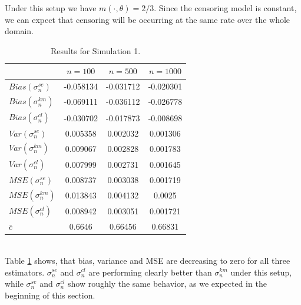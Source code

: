  Under this setup we have $m(\cdot, \theta) = 2/3$. Since the censoring model is constant, we can expect that censoring will be occurring at the same rate over the whole domain.
\begin{table}[h!]
	\begin{center}
		\begin{tabular}{| l || c | c | c |}
			\hline
			&       $n=100$   &    $n=500$    &    $n=1000$\\
			\hline
			\hline
			$Bias(\sigma_n^{se})$ & -0.058134 & -0.031712 & -0.020301\\
			$Bias(\sigma_n^{km})$ & -0.069111 & -0.036112 & -0.026778\\
			$Bias(\sigma_n^{cl})$ & -0.030702 & -0.017873 & -0.008698\\
			\hline
			$Var(\sigma_n^{se})$ & 0.005358 & 0.002032 & 0.001306\\
			$Var(\sigma_n^{km})$ & 0.009067 & 0.002828 & 0.001783\\
			$Var(\sigma_n^{cl})$ & 0.007999 & 0.002731 & 0.001645\\
			\hline
			$MSE(\sigma_n^{se})$ & 0.008737 & 0.003038 & 0.001719\\
			$MSE(\sigma_n^{km})$  & 0.013843 & 0.004132 & 0.0025\\
			$MSE(\sigma_n^{cl})$ & 0.008942 & 0.003051 & 0.001721\\
			\hline
			\hline
			$\bar c$  &0.6646 & 0.66456 & 0.66831\\
			\hline
		\end{tabular}
	\end{center}
	\caption{Results for Simulation 1.}
	\label{tab:res_expexp1}
\end{table}\\
%
Table \ref{tab:res_expexp1} shows, that bias, variance and MSE are decreasing to zero for all three estimators. $\sigma_n^{se}$ and $\sigma_n^{cl}$ are performing clearly better than $\sigma_n^{km}$ under this setup, while $\sigma_n^{se}$ and $\sigma_n^{cl}$ show roughly the same behavior, as we expected in the beginning of this section. 

